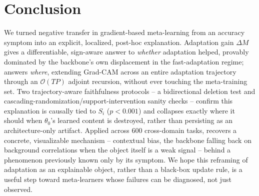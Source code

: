\section{Conclusion}
\label{sec:conclusion}

We turned negative transfer in gradient-based meta-learning from an accuracy symptom into an explicit, localized, post-hoc explanation. Adaptation gain $\Delta M$ gives a differentiable, sign-aware answer to \emph{whether} adaptation helped, provably dominated by the backbone's own displacement in the fast-adaptation regime; \fama answers \emph{where}, extending Grad-CAM across an entire adaptation trajectory through an $\mathcal{O}(TP)$ adjoint recursion, without ever touching the meta-training set. Two trajectory-aware faithfulness protocols -- a bidirectional deletion test and cascading-randomization/support-intervention sanity checks -- confirm this explanation is causally tied to $S_i$ ($p<0.001$) and collapses exactly where it should when $\theta_0$'s learned content is destroyed, rather than persisting as an architecture-only artifact. Applied across 600 cross-domain tasks, \fama recovers a concrete, visualizable mechanism -- contextual bias, the backbone falling back on background correlations when the object itself is a weak signal -- behind a phenomenon previously known only by its symptom. We hope this reframing of adaptation as an explainable object, rather than a black-box update rule, is a useful step toward meta-learners whose failures can be diagnosed, not just observed.
